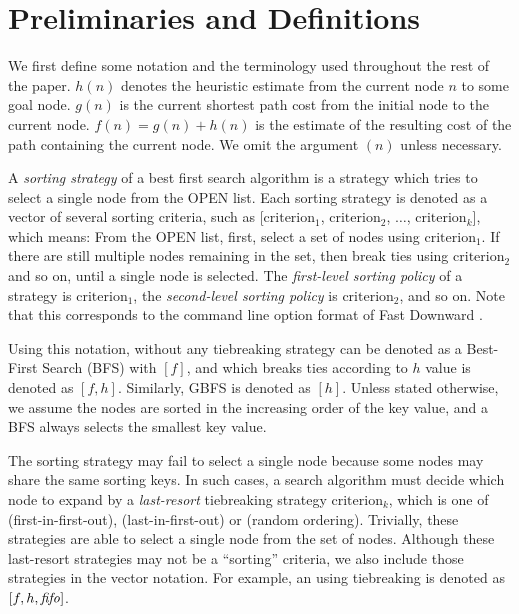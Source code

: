 \section{Preliminaries and Definitions}

\label{sec:preliminaries}

We first define some notation and the terminology used throughout the
rest of the paper.
$h(n)$ denotes the heuristic estimate from the current node $n$ to some
goal node.
$g(n)$ is the current shortest path cost from the initial node to the
current node.
$f(n)=g(n)+h(n)$ is the estimate of the resulting cost of the path
containing the current node.
We omit the argument $(n)$ unless necessary.

A \emph{sorting strategy} of a best first search algorithm is a strategy
which tries to select a single node from the OPEN list.
Each sorting strategy is denoted as a vector of several sorting
criteria, such as
[$\text{criterion}_1$, $\text{criterion}_2$, $\ldots$,
$\text{criterion}_k$], which means: From the OPEN list, first, select a
set of nodes using $\text{criterion}_1$.  If there are still multiple
nodes remaining in the set, then break ties using $\text{criterion}_2$
and so on, until a single node is selected.  The \emph{first-level
sorting policy} of a strategy is $\text{criterion}_1$, the
\emph{second-level sorting policy} is $\text{criterion}_2$, and so on.
Note that this corresponds to the command line option format of Fast
Downward \cite{Helmert2006}.

Using this notation, \astar without any tiebreaking strategy can be
denoted as a Best-First Search (BFS) with $[f]$, and \astar which breaks ties according to $h$
value is denoted as $[f,h]$. Similarly, GBFS is denoted as 
$[h]$.  Unless stated otherwise, we assume the nodes are sorted in the
increasing order of the key value, and a BFS always selects the smallest
key value.

The sorting strategy may fail to select a single node because some nodes
may share the same sorting keys. In such cases, a search algorithm must
decide which node to expand by a \emph{last-resort} tiebreaking
strategy $\text{criterion}_k$, which is one of \fifo (first-in-first-out), \lifo
(last-in-first-out) or \ro (random ordering).  Trivially, these
strategies are able to select a single node from the set of
nodes. Although these last-resort strategies may not be a ``sorting''
criteria, we also include those strategies in the vector notation. For
example, an \astar using \fifo tiebreaking is denoted as $[f,h,{\text{\textit{fifo}}}]$.


